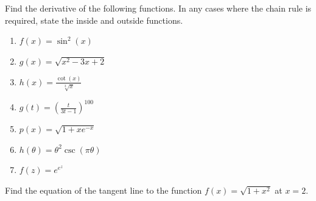 \documentclass{ximera}
\begin{document}
\begin{exercise}
Find the derivative of the following functions. In any cases where the chain rule is required, state the inside and outside functions.
    \begin{enumerate}
        \item $\displaystyle f(x)=\sin^2(x)$ 

        \item $g(x)=\sqrt{x^2-3x+2}$ 

        \item $\displaystyle h(x)=\frac{\cot(x)}{\sqrt[3]{x}}$

        \item $g(t)=(\frac{t}{3t-1})^{100}$
        
        \item $p(x)=\sqrt{1+xe^{-x}}$
        
        \item $\displaystyle h(\theta)=\theta^2\csc(\pi\theta)$

        \item $f(z)=e^{e^z}$
        
    \end{enumerate}

\end{exercise}

\begin{exercise}
    Find the equation of the tangent line to the function $f(x)=\sqrt{1+x^2}$ at $x=2$.
\end{exercise}
\end{document}
